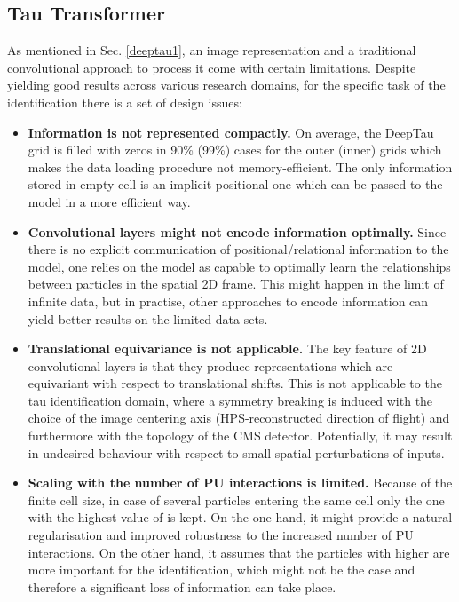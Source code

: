 \subsection{Tau Transformer} \label{tat}
As mentioned in Sec. \ref{deeptau1}, an image representation and a traditional convolutional approach to process it come with certain limitations. Despite yielding good results across various research domains, for the specific task of the \tauh identification there is a set of design issues:
\begin{itemize}
    \item \textbf{Information is not represented compactly.} On average, the DeepTau grid is filled with zeros in 90\% (99\%) cases for the outer (inner) grids which makes the data loading procedure not memory-efficient. The only information stored in empty cell is an implicit positional one which can be passed to the model in a more efficient way.
    \item \textbf{Convolutional layers might not encode information optimally.} Since there is no explicit communication of positional/relational information to the model, one relies on the model as capable to optimally learn the relationships between particles in the spatial 2D frame. This might happen in the limit of infinite data, but in practise, other approaches to encode information can yield better results on the limited data sets.
    \item \textbf{Translational equivariance is not applicable.} The key feature of 2D convolutional layers is that they produce representations which are equivariant with respect to translational shifts. This is not applicable to the tau identification domain, where a symmetry breaking is induced with the choice of the image centering axis (HPS-reconstructed direction of flight) and furthermore with the topology of the CMS detector. Potentially, it may result in undesired behaviour with respect to small spatial perturbations of inputs. 
    \item \textbf{Scaling with the number of PU interactions is limited.} Because of the finite cell size, in case of several particles entering the same cell only the one with the highest value of \pt is kept. On the one hand, it might provide a natural regularisation and improved robustness to the increased number of PU interactions. On the other hand, it assumes that the particles with higher \pt are more important for the \tauh identification, which might not be the case and therefore a significant loss of information can take place.  
\end{itemize}

